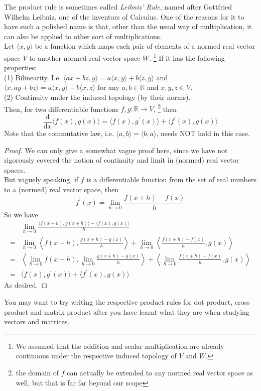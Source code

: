 The product rule is sometimes called \textit{Leibniz' Rule}, named after Gottfried Wilhelm Leibniz, one of the inventors of Calculus.
One of the reasons for it to have such a polished name is that, other than the usual way of multiplication, it can also be applied to other sort of multiplications.\\
Let $\langle x,y\rangle$ be a function which maps each pair of elements of a normed real vector space $V$ to another normed real vector space $W$.
\footnote{We assumed that the addition and scalar multiplication are already continuous under the respective induced topology of $V$ and $W$.}
If it has the following properties:\\
(1) Bilinearity. I.e. $\langle ax+bz,y\rangle=a\langle x,y\rangle+b\langle z,y\rangle$ and $\langle x,ay+bz\rangle=a\langle x,y\rangle+b\langle x,z\rangle$ for any $a,b\in\mathbb R$ and $x,y,z\in V$.\\
(2) Continuity under the induced topology (by their norms).\\
Then, for two differentiable functions $f,g:\mathbb R\to V$,
\footnote{the domain of $f$ can actually be extended to any normed real vector space as well, but that is far far beyond our scope}
then
$$\frac{\mathrm d}{\mathrm dx}\langle f(x),g(x)\rangle=\langle f(x),g^\prime (x)\rangle+\langle f^\prime(x),g(x)\rangle$$
Note that the commutative law, i.e. $\langle a,b\rangle=\langle b,a\rangle$, needs NOT hold in this case.
\begin{proof}
    We can only give a somewhat vague proof here, since we have not rigorously covered the notion of continuity and limit in (normed) real vector spaces.\\
    But vaguely speaking, if $f$ is a differentiable function from the set of real numbers to a (normed) real vector space, then 
    $$f^\prime(x)=\lim_{h\to 0}\frac{f(x+h)-f(x)}{h}$$
    So we have
    \begin{align*}
        &\lim_{h\to0}\frac{\langle f(x+h),g(x+h)\rangle-\langle f(x), g(x)\rangle}{h}\\
        =&\lim_{h\to0}\left\langle f(x+h),\frac{g(x+h)-g(x)}{h}\right\rangle+\lim_{h\to0}\left\langle\frac{f(x+h)-f(x)}{h},g(x)\right\rangle\tag{Bilinearity}\\
        =&\left\langle \lim_{h\to0}f(x+h),\lim_{h\to0}\frac{g(x+h)-g(x)}{h}\right\rangle+\left\langle\lim_{h\to0}\frac{f(x+h)-f(x)}{h},g(x)\right\rangle\tag{Continuity}\\
        =&\langle f(x),g^\prime (x)\rangle+\langle f^\prime(x),g(x)\rangle
    \end{align*}
    As desired.
\end{proof}
You may want to try writing the respective product rules for dot product, cross product and matrix product after you have learnt what they are when studying vectors and matrices.